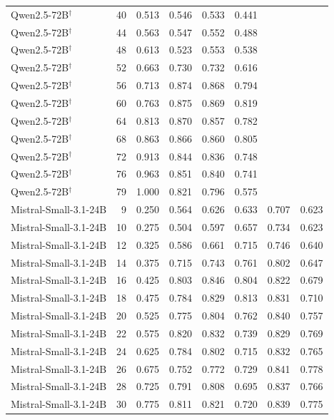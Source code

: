\begin{table}
\begin{tabular}{lrrrrrrr}
Qwen2.5-72B$^\dagger$ & 40 & 0.513 & 0.546 & 0.533 & 0.441 &  &  \\
Qwen2.5-72B$^\dagger$ & 44 & 0.563 & 0.547 & 0.552 & 0.488 &  &  \\
Qwen2.5-72B$^\dagger$ & 48 & 0.613 & 0.523 & 0.553 & 0.538 &  &  \\
Qwen2.5-72B$^\dagger$ & 52 & 0.663 & 0.730 & 0.732 & 0.616 &  &  \\
Qwen2.5-72B$^\dagger$ & 56 & 0.713 & 0.874 & 0.868 & 0.794 &  &  \\
Qwen2.5-72B$^\dagger$ & 60 & 0.763 & 0.875 & 0.869 & 0.819 &  &  \\
Qwen2.5-72B$^\dagger$ & 64 & 0.813 & 0.870 & 0.857 & 0.782 &  &  \\
Qwen2.5-72B$^\dagger$ & 68 & 0.863 & 0.866 & 0.860 & 0.805 &  &  \\
Qwen2.5-72B$^\dagger$ & 72 & 0.913 & 0.844 & 0.836 & 0.748 &  &  \\
Qwen2.5-72B$^\dagger$ & 76 & 0.963 & 0.851 & 0.840 & 0.741 &  &  \\
Qwen2.5-72B$^\dagger$ & 79 & 1.000 & 0.821 & 0.796 & 0.575 &  &  \\
Mistral-Small-3.1-24B & 9 & 0.250 & 0.564 & 0.626 & 0.633 & 0.707 & 0.623 \\
Mistral-Small-3.1-24B & 10 & 0.275 & 0.504 & 0.597 & 0.657 & 0.734 & 0.623 \\
Mistral-Small-3.1-24B & 12 & 0.325 & 0.586 & 0.661 & 0.715 & 0.746 & 0.640 \\
Mistral-Small-3.1-24B & 14 & 0.375 & 0.715 & 0.743 & 0.761 & 0.802 & 0.647 \\
Mistral-Small-3.1-24B & 16 & 0.425 & 0.803 & 0.846 & 0.804 & 0.822 & 0.679 \\
Mistral-Small-3.1-24B & 18 & 0.475 & 0.784 & 0.829 & 0.813 & 0.831 & 0.710 \\
Mistral-Small-3.1-24B & 20 & 0.525 & 0.775 & 0.804 & 0.762 & 0.840 & 0.757 \\
Mistral-Small-3.1-24B & 22 & 0.575 & 0.820 & 0.832 & 0.739 & 0.829 & 0.769 \\
Mistral-Small-3.1-24B & 24 & 0.625 & 0.784 & 0.802 & 0.715 & 0.832 & 0.765 \\
Mistral-Small-3.1-24B & 26 & 0.675 & 0.752 & 0.772 & 0.729 & 0.841 & 0.778 \\
Mistral-Small-3.1-24B & 28 & 0.725 & 0.791 & 0.808 & 0.695 & 0.837 & 0.766 \\
Mistral-Small-3.1-24B & 30 & 0.775 & 0.811 & 0.821 & 0.720 & 0.839 & 0.775 \\

\end{tabular}
\end{table}

